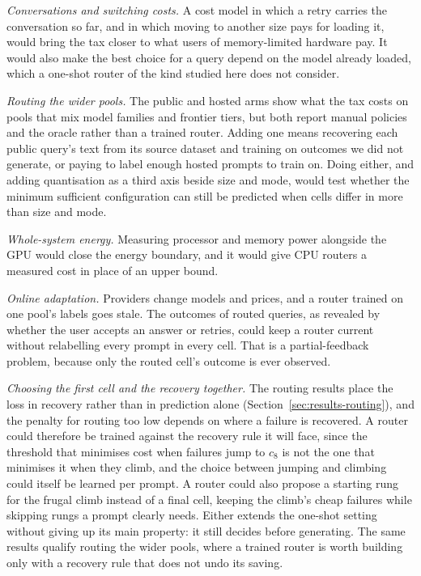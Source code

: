 \emph{Conversations and switching costs.} A cost model in which a retry
carries the conversation so far, and in which moving to another size pays
for loading it, would bring the tax closer to what users of memory-limited
hardware pay. It would also make the best choice for a query depend on the
model already loaded, which a one-shot router of the kind studied here does
not consider.

\emph{Routing the wider pools.} The public and hosted arms show what the tax
costs on pools that mix model families and frontier tiers, but both report
manual policies and the oracle rather than a trained router. Adding one
means recovering each public query's text from its source dataset and
training on outcomes we did not generate, or paying to label enough hosted
prompts to train on. Doing either, and adding quantisation as a third axis
beside size and mode, would test whether the minimum sufficient
configuration can still be predicted when cells differ in more than size and
mode.

\emph{Whole-system energy.} Measuring processor and memory power alongside
the GPU would close the energy boundary, and it would give CPU routers a
measured cost in place of an upper bound.

\emph{Online adaptation.} Providers change models and prices, and a router
trained on one pool's labels goes stale. The outcomes of routed queries,
as revealed by whether the user accepts an answer or retries, could keep a
router current without relabelling every prompt in every cell. That is a
partial-feedback problem, because only the routed cell's outcome is ever
observed.

\emph{Choosing the first cell and the recovery together.} The routing
results place the loss in recovery rather than in prediction alone
(Section~\ref{sec:results-routing}), and the penalty for routing too low
depends on where a failure is recovered. A router could therefore be trained
against the recovery rule it will face, since the threshold that minimises
cost when failures jump to $c_8$ is not the one that minimises it when they
climb, and the choice between jumping and climbing could itself be learned
per prompt. A router could also propose a starting rung for the frugal climb
instead of a final cell, keeping the climb's cheap failures while skipping
rungs a prompt clearly needs. Either extends the one-shot setting without
giving up its main property: it still decides before generating. The same
results qualify routing the wider pools, where a trained router is worth
building only with a recovery rule that does not undo its saving.
